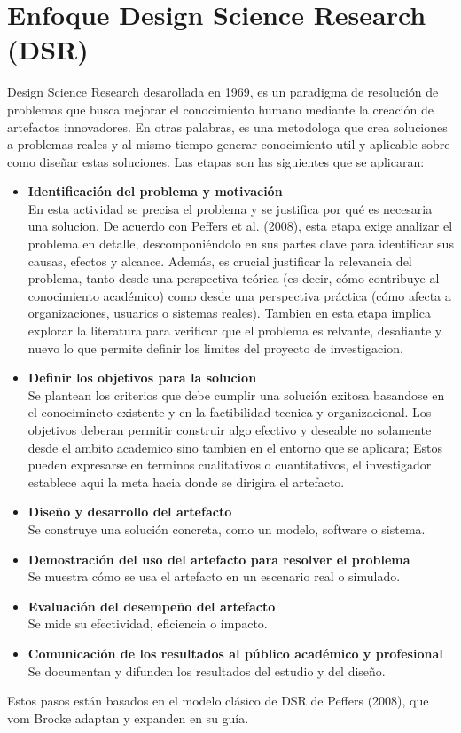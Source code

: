 \section{Enfoque Design Science Research (DSR)}
Design Science Research desarollada en 1969, es un paradigma de resolución de problemas que busca mejorar el 
conocimiento humano mediante la creación de artefactos innovadores. \cite{vomBrocke2020} En otras palabras, es una metodologa que crea soluciones a problemas  reales y al mismo tiempo generar
conocimiento util y aplicable sobre como diseñar estas soluciones. Las etapas son las siguientes que se aplicaran: 
\begin{itemize}[align=left, label=--]
    \item \textbf{Identificación del problema y motivación} \\
    En esta actividad se precisa el problema y se justifica por qué es necesaria una solucion. De acuerdo con Peffers et al. (2008), esta etapa exige analizar el problema en detalle, descomponiéndolo en sus partes clave para identificar sus causas, efectos y alcance. Además, es crucial justificar la relevancia del problema, tanto desde una perspectiva teórica (es decir, cómo contribuye al conocimiento académico) como desde una perspectiva práctica (cómo afecta a organizaciones, usuarios o sistemas reales). 
    Tambien en esta etapa implica explorar la literatura para verificar que el problema es relvante, desafiante y nuevo lo que 
    permite definir los limites del proyecto de investigacion.
    \item \textbf{Definir los objetivos para la solucion}\\
    Se plantean los criterios que debe cumplir una solución exitosa basandose en el conocimineto existente y en la factibilidad tecnica y organizacional.
    Los objetivos deberan permitir construir algo efectivo y deseable no solamente desde el ambito academico sino tambien en el entorno que se aplicara; Estos pueden expresarse en terminos cualitativos o cuantitativos, el investigador establece aqui la meta hacia donde se dirigira el artefacto.
    \item \textbf{Diseño y desarrollo del artefacto}\\
    Se construye una solución concreta, como un modelo, software o sistema.
    
    \item \textbf{Demostración del uso del artefacto para resolver el problema}\\
    Se muestra cómo se usa el artefacto en un escenario real o simulado.
    \item \textbf{Evaluación del desempeño del artefacto}\\
    Se mide su efectividad, eficiencia o impacto.
    \item \textbf{Comunicación de los resultados al público académico y profesional}\\
    Se documentan y difunden los resultados del estudio y del diseño.
\end{itemize}
Estos pasos están basados en el modelo clásico de DSR de Peffers (2008), que vom Brocke adaptan y expanden en su guía.

